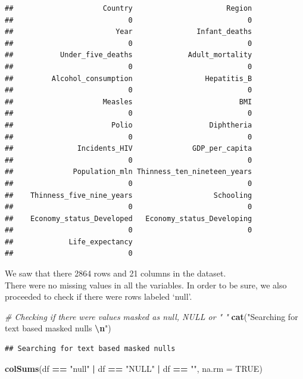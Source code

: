 \documentclass[
  10pt,
]{article}
\newenvironment{Shaded}{\begin{snugshade}}{\end{snugshade}}
\newcommand{\AttributeTok}[1]{\textcolor[rgb]{0.13,0.29,0.53}{#1}}
\newcommand{\CommentTok}[1]{\textcolor[rgb]{0.56,0.35,0.01}{\textit{#1}}}
\newcommand{\ConstantTok}[1]{\textcolor[rgb]{0.56,0.35,0.01}{#1}}
\newcommand{\FunctionTok}[1]{\textcolor[rgb]{0.13,0.29,0.53}{\textbf{#1}}}
\newcommand{\NormalTok}[1]{#1}
\newcommand{\SpecialCharTok}[1]{\textcolor[rgb]{0.81,0.36,0.00}{\textbf{#1}}}
\newcommand{\StringTok}[1]{\textcolor[rgb]{0.31,0.60,0.02}{#1}}
\begin{document}
\begin{verbatim}
##                     Country                      Region 
##                           0                           0 
##                        Year               Infant_deaths 
##                           0                           0 
##           Under_five_deaths             Adult_mortality 
##                           0                           0 
##         Alcohol_consumption                 Hepatitis_B 
##                           0                           0 
##                     Measles                         BMI 
##                           0                           0 
##                       Polio                  Diphtheria 
##                           0                           0 
##               Incidents_HIV              GDP_per_capita 
##                           0                           0 
##              Population_mln Thinness_ten_nineteen_years 
##                           0                           0 
##    Thinness_five_nine_years                   Schooling 
##                           0                           0 
##    Economy_status_Developed   Economy_status_Developing 
##                           0                           0 
##             Life_expectancy 
##                           0
\end{verbatim}

We saw that there 2864 rows and 21 columns in the dataset.\\
There were no missing values in all the variables. In order to be sure,
we also proceeded to check if there were rows labeled `null'.

\begin{Shaded}
\begin{Highlighting}[]
\CommentTok{\# Checking if there were values masked as \textquotesingle{}null\textquotesingle{}, \textquotesingle{}NULL\textquotesingle{} or " "}
\FunctionTok{cat}\NormalTok{(}\StringTok{"Searching for text based masked nulls }\SpecialCharTok{\textbackslash{}n}\StringTok{"}\NormalTok{)}
\end{Highlighting}
\end{Shaded}

\begin{verbatim}
## Searching for text based masked nulls
\end{verbatim}

\begin{Shaded}
\begin{Highlighting}[]
\FunctionTok{colSums}\NormalTok{(df }\SpecialCharTok{==} \StringTok{"null"} \SpecialCharTok{|}\NormalTok{ df }\SpecialCharTok{==} \StringTok{"NULL"} \SpecialCharTok{|}\NormalTok{ df }\SpecialCharTok{==} \StringTok{""}\NormalTok{, }\AttributeTok{na.rm =} \ConstantTok{TRUE}\NormalTok{)}
\end{Highlighting}
\end{Shaded}
\end{document}
